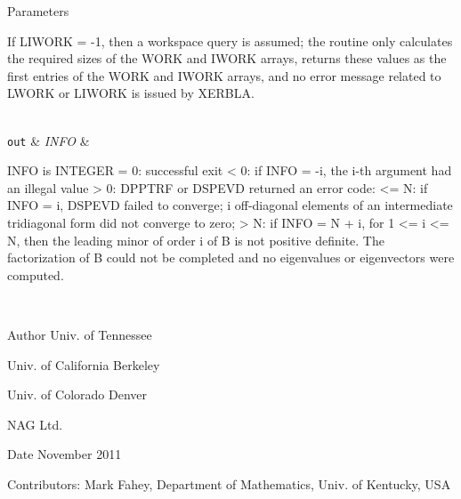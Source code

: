 \begin{DoxyParams}[1]{Parameters}
\begin{DoxyVerb}
          If LIWORK = -1, then a workspace query is assumed; the
          routine only calculates the required sizes of the WORK and
          IWORK arrays, returns these values as the first entries of
          the WORK and IWORK arrays, and no error message related to
          LWORK or LIWORK is issued by XERBLA.\end{DoxyVerb}
\\
\hline
\mbox{\tt out}  & {\em I\+N\+F\+O} & \begin{DoxyVerb}          INFO is INTEGER
          = 0:  successful exit
          < 0:  if INFO = -i, the i-th argument had an illegal value
          > 0:  DPPTRF or DSPEVD returned an error code:
             <= N:  if INFO = i, DSPEVD failed to converge;
                    i off-diagonal elements of an intermediate
                    tridiagonal form did not converge to zero;
             > N:   if INFO = N + i, for 1 <= i <= N, then the leading
                    minor of order i of B is not positive definite.
                    The factorization of B could not be completed and
                    no eigenvalues or eigenvectors were computed.\end{DoxyVerb}
 \\
\hline
\end{DoxyParams}
\begin{DoxyAuthor}{Author}
Univ. of Tennessee 

Univ. of California Berkeley 

Univ. of Colorado Denver 

N\+A\+G Ltd. 
\end{DoxyAuthor}
\begin{DoxyDate}{Date}
November 2011 
\end{DoxyDate}
\begin{DoxyParagraph}{Contributors\+: }
Mark Fahey, Department of Mathematics, Univ. of Kentucky, U\+S\+A 
\end{DoxyParagraph}

